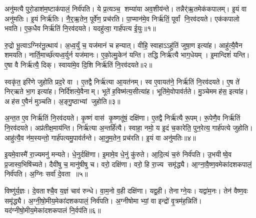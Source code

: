 \clearpage
{}
\setcounter{anuvakam}{0}

अनु॑मत्यै पुरो॒डाश॑म॒ष्टाक॑पालं॒ निर्व॑पति।
ये प्र॒त्यञ्च॒ शम्या॑या अव॒शीय॑न्ते।
तन्नैर्॑ऋ॒तमेक॑कपालम्।
इ॒यं वा अनु॑मतिः।
इ॒यं निर्\mbox{}ऋ॑तिः।
नै॒र्॒ऋ॒तेन॒ पूर्वे॑ण॒ प्रच॑रति।
पा॒प्मान॑मे॒व निर्\mbox{}ऋ॑तिं॒ पूर्वां नि॒रव॑दयते।
एक॑कपालो भवति।
ए॒क॒धैव निर्\mbox{}ऋ॑तिं नि॒रव॑दयते।
यदहु॑त्वा॒ गार्\mbox{}ह॑पत्य ई॒युः॥१॥

रु॒द्रो भू॒त्वाऽग्निर॑नू॒त्थाय॑।
अ॒ध्व॒र्युं च॒ यज॑मानं च हन्यात्।
वीहि॒ स्वाहाऽऽहु॑तिं जुषा॒ण इत्या॑ह।
आहु॑त्यै॒वैन शमयति।
नार्ति॒मार्च्छ॑त्यध्व॒र्युर्न यज॑मानः।
ए॒को॒ल्मु॒केन॑ यन्ति।
तद्धि निर्\mbox{}ऋ॑त्यै भाग॒धेयम्।
इ॒मान्दिशं॑ यन्ति।
ए॒षा वै निर्\mbox{}ऋ॑त्यै॒ दिक्।
स्वाया॑मे॒व दि॒शि निर्\mbox{}ऋ॑तिं नि॒रव॑दयते॥२॥

स्वकृ॑त॒ इरि॑णे जुहोति प्रद॒रे वा।
ए॒तद्वै निर्\mbox{}ऋ॑त्या आ॒यत॑नम्।
स्व ए॒वायत॑ने॒ निर्\mbox{}ऋ॑तिं नि॒रव॑दयते।
ए॒ष ते॑ निर्‌ऋते भा॒ग इत्या॑ह।
निर्दि॑शत्ये॒वैनाम्।
भूते॑ ह॒विष्म॑त्य॒सीत्या॑ह।
भूति॑मे॒वोपाव॑र्तते।
मु॒ञ्चेममह॑स॒ इत्या॑ह।
अह॑स ए॒वैनं॑ मुञ्चति।
अ॒ङ्गु॒ष्ठाभ्यां जुहोति॥३॥

अ॒न्त॒त ए॒व निर्\mbox{}ऋ॑तिं नि॒रव॑दयते।
कृ॒ष्णं वास॑ कृ॒ष्णतू॑षं॒ दक्षि॑णा।
ए॒तद्वै निर्\mbox{}ऋ॑त्यै रू॒पम्।
रू॒पेणै॒व निर्\mbox{}ऋ॑तिं नि॒रव॑दयते।
अप्र॑तीक्ष॒माय॑न्ति।
निर्\mbox{}ऋ॑त्या अ॒न्तर्\mbox{}हि॑त्यै।
स्वाहा॒ नमो॒ य इ॒दं च॒कारेति॒ पुन॒रेत्य॒ गार्\mbox{}ह॑पत्ये जुहोति।
आहु॑त्यै॒व न॑म॒स्यन्तो॒ गार्\mbox{}ह॑पत्यमु॒पाव॑र्तन्ते।
आ॒नु॒म॒तेन॒ प्रच॑रति।
इ॒यं वा अनु॑मतिः॥४॥

इ॒यमे॒वास्मै॑ रा॒ज्यमनु॑ मन्यते।
धे॒नुर्दक्षि॑णा।
इ॒मामे॒व धे॒नुं कु॑रुते।
आ॒दि॒त्यं च॒रुं निर्व॑पति।
उ॒भयीष्वे॒व प्र॒जास्व॒भिषि॑च्यते।
दैवी॑षु च॒ मानु॑षीषु च।
वरो॒ दक्षि॑णा।
वरो॒ हि रा॒ज्य समृ॑द्ध्यै।
आ॒ग्ना॒वै॒ष्ण॒वमेका॑दशकपालं॒ निर्व॑पति।
अ॒ग्निः सर्वा॑ दे॒वता॥५॥

विष्णु॑र्\mbox{}य॒ज्ञः।
दे॒वताश्चै॒व य॒ज्ञं चाव॑ रुन्धे।
वा॒म॒नो व॒ही दक्षि॑णा।
यद्व॒ही।
तेनाग्ने॒यः।
यद्वा॑म॒नः।
तेन॑ वैष्ण॒वः समृ॑द्ध्यै।
अ॒ग्नी॒षो॒मीय॒मेका॑दशकपालं॒ निर्व॑पति।
अ॒ग्नीषोमाभ्यां॒ वा इन्द्रो॑ वृ॒त्रम॑ह॒न्निति॑।
यद॑ग्नीषो॒मीय॒मेका॑दशकपालं नि॒र्वप॑ति॥६॥

